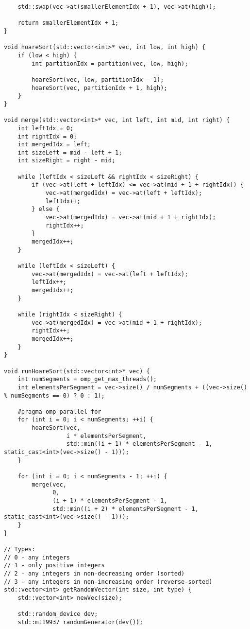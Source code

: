 \documentclass{report}
\begin{document}
\begin{lstlisting}
    std::swap(vec->at(smallerElementIdx + 1), vec->at(high));

    return smallerElementIdx + 1;
}

void hoareSort(std::vector<int>* vec, int low, int high) {
    if (low < high) {
        int partitionIdx = partition(vec, low, high);

        hoareSort(vec, low, partitionIdx - 1);
        hoareSort(vec, partitionIdx + 1, high);
    }
}

void merge(std::vector<int>* vec, int left, int mid, int right) {
    int leftIdx = 0;
    int rightIdx = 0;
    int mergedIdx = left;
    int sizeLeft = mid - left + 1;
    int sizeRight = right - mid;

    while (leftIdx < sizeLeft && rightIdx < sizeRight) {
        if (vec->at(left + leftIdx) <= vec->at(mid + 1 + rightIdx)) {
            vec->at(mergedIdx) = vec->at(left + leftIdx);
            leftIdx++;
        } else {
            vec->at(mergedIdx) = vec->at(mid + 1 + rightIdx);
            rightIdx++;
        }
        mergedIdx++;
    }

    while (leftIdx < sizeLeft) {
        vec->at(mergedIdx) = vec->at(left + leftIdx);
        leftIdx++;
        mergedIdx++;
    }

    while (rightIdx < sizeRight) {
        vec->at(mergedIdx) = vec->at(mid + 1 + rightIdx);
        rightIdx++;
        mergedIdx++;
    }
}

void runHoareSort(std::vector<int>* vec) {
    int numSegments = omp_get_max_threads();
    int elementsPerSegment = vec->size() / numSegments + ((vec->size() % numSegments == 0) ? 0 : 1);

    #pragma omp parallel for
    for (int i = 0; i < numSegments; ++i) {
        hoareSort(vec,
                  i * elementsPerSegment,
                  std::min((i + 1) * elementsPerSegment - 1, static_cast<int>(vec->size() - 1)));
    }

    for (int i = 0; i < numSegments - 1; ++i) {
        merge(vec,
              0,
              (i + 1) * elementsPerSegment - 1,
              std::min((i + 2) * elementsPerSegment - 1, static_cast<int>(vec->size() - 1)));
    }
}

// Types:
// 0 - any integers
// 1 - only positive integers
// 2 - any integers in non-decreasing order (sorted)
// 3 - any integers in non-increasing order (reverse-sorted)
std::vector<int> getRandomVector(int size, int type) {
    std::vector<int> newVec(size);

    std::random_device dev;
    std::mt19937 randomGenerator(dev());


\end{lstlisting}
\end{document}
